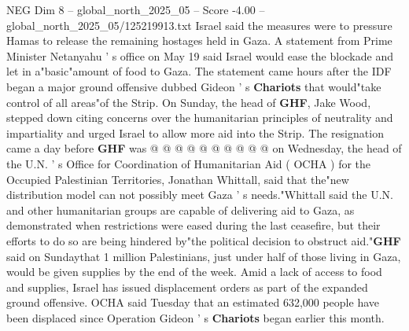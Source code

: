 \begin{textsample}{NEG Dim 8 – global\_north\_2025\_05 – Score -4.00 – global\_north\_2025\_05/125219913.txt}
Israel said the measures were to pressure Hamas to release the remaining hostages held in Gaza.
A statement from Prime Minister Netanyahu ' s office on May 19 said Israel would ease the blockade and let in a"basic"amount of food to Gaza.
The statement came hours after the IDF began a major ground offensive dubbed Gideon ' s \textbf{Chariots} that would"take control of all areas"of the Strip.
On Sunday, the head of \textbf{GHF}, Jake Wood, stepped down citing concerns over the humanitarian principles of neutrality and impartiality and urged Israel to allow more aid into the Strip.
The resignation came a day before \textbf{GHF} was @ @ @ @ @ @ @ @ @ @ on Wednesday, the head of the U.N. ' s Office for Coordination of Humanitarian Aid ( OCHA ) for the Occupied Palestinian Territories, Jonathan Whittall, said that the"new distribution model can not possibly meet Gaza ' s needs."Whittall said the U.N. and other humanitarian groups are capable of delivering aid to Gaza, as demonstrated when restrictions were eased during the last ceasefire, but their efforts to do so are being hindered by"the political decision to obstruct aid."\textbf{GHF} said on Sundaythat 1 million Palestinians, just under half of those living in Gaza, would be given supplies by the end of the week.
Amid a lack of access to food and supplies, Israel has issued displacement orders as part of the expanded ground offensive.
OCHA said Tuesday that an estimated 632,000 people have been displaced since Operation Gideon ' s \textbf{Chariots} began earlier this month.

\end{textsample}
